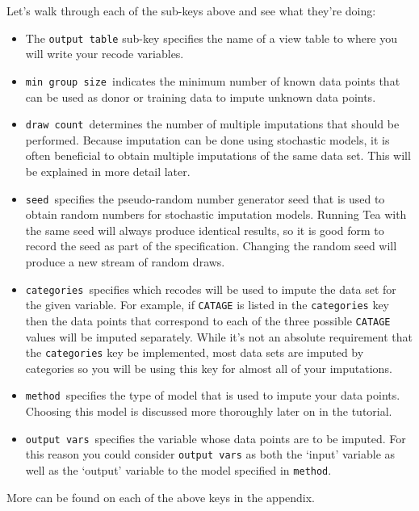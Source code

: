 \documentclass{article}
\begin{document}
Let's walk through each of the sub-keys above and see what they're doing:
\begin{itemize}
\item The {\tt output table} sub-key specifies the name of a view table to 
where you will write your recode variables. 
\item {\tt min group size}\ indicates the minimum number of known data points that can be 
used as donor or training data to impute unknown data points. 
\item {\tt draw count}\ determines the number of multiple imputations that should be performed. 
Because imputation can be done using stochastic models, it is often beneficial to obtain multiple 
imputations of the same data set. This will be explained in more detail later. 
\item {\tt seed}\ specifies the pseudo-random number generator seed that is used to obtain 
random numbers for stochastic imputation models. Running Tea with the same seed will
always produce identical results, so it is good form to record the seed as part of the 
specification. Changing the random seed will produce a new stream of random draws.
\item {\tt categories}\  specifies which recodes will be used to impute the data set for 
the given variable. For example, if {\tt CATAGE} is listed in the {\tt categories} key then the 
data points that correspond to each of the three possible {\tt CATAGE} values will be imputed 
separately. While it's not an absolute requirement that the {\tt categories} key be implemented, most data 
sets are imputed by categories so you will be using this key for almost all of your imputations.
\item {\tt method}\ specifies the type of model that is used to impute your data points. 
Choosing this model is discussed more thoroughly later on in the tutorial.
\item {\tt output vars}\ specifies the variable whose data points are to be imputed. For this reason 
you could consider {\tt output vars} as both the `input' variable as well as the `output' variable 
to the model specified in {\tt method}.
\end{itemize}
More can be found on each of the above keys in the appendix.

\end{document}

